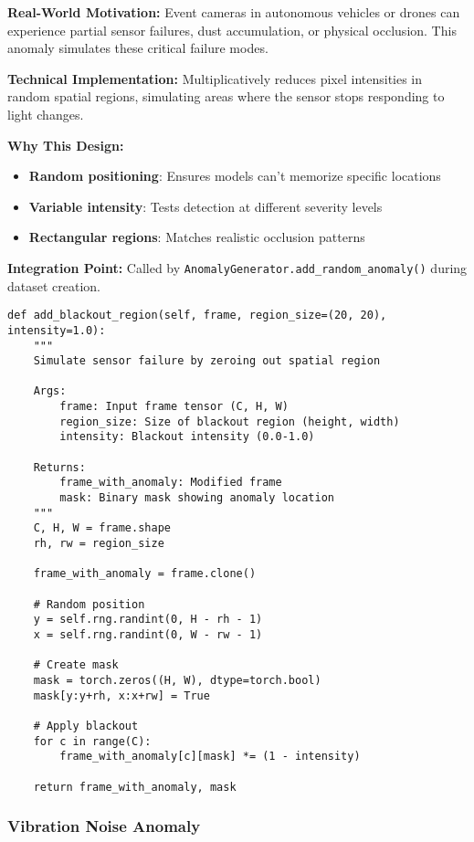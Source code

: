 \documentclass[12pt,a4paper]{article}
\begin{document}
\textbf{Real-World Motivation:} Event cameras in autonomous vehicles or drones can experience partial sensor failures, dust accumulation, or physical occlusion. This anomaly simulates these critical failure modes.

\textbf{Technical Implementation:} Multiplicatively reduces pixel intensities in random spatial regions, simulating areas where the sensor stops responding to light changes.

\textbf{Why This Design:}
\begin{itemize}
    \item \textbf{Random positioning}: Ensures models can't memorize specific locations
    \item \textbf{Variable intensity}: Tests detection at different severity levels
    \item \textbf{Rectangular regions}: Matches realistic occlusion patterns
\end{itemize}

\textbf{Integration Point:} Called by \texttt{AnomalyGenerator.add\_random\_anomaly()} during dataset creation.

\begin{lstlisting}[caption={Blackout Region Implementation - Simulating Sensor Occlusion}]
def add_blackout_region(self, frame, region_size=(20, 20), intensity=1.0):
    """
    Simulate sensor failure by zeroing out spatial region

    Args:
        frame: Input frame tensor (C, H, W)
        region_size: Size of blackout region (height, width)
        intensity: Blackout intensity (0.0-1.0)

    Returns:
        frame_with_anomaly: Modified frame
        mask: Binary mask showing anomaly location
    """
    C, H, W = frame.shape
    rh, rw = region_size

    frame_with_anomaly = frame.clone()

    # Random position
    y = self.rng.randint(0, H - rh - 1)
    x = self.rng.randint(0, W - rw - 1)

    # Create mask
    mask = torch.zeros((H, W), dtype=torch.bool)
    mask[y:y+rh, x:x+rw] = True

    # Apply blackout
    for c in range(C):
        frame_with_anomaly[c][mask] *= (1 - intensity)

    return frame_with_anomaly, mask
\end{lstlisting}

\subsubsection{Vibration Noise Anomaly}
\end{document}
